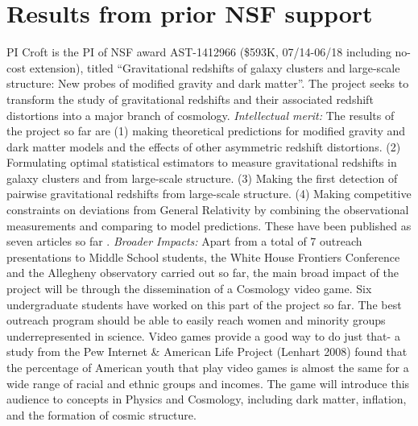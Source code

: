 \section{Results from prior NSF support}

PI Croft is the PI of NSF award AST-1412966 (\$593K, 07/14-06/18
including no-cost extension), titled ``Gravitational redshifts of
galaxy clusters and large-scale structure: New probes of modified
gravity and dark matter''.  The project seeks to transform the study
of gravitational redshifts and their associated redshift distortions
into a major branch of cosmology.  {\it Intellectual merit:} The
results of the project so far are (1) making theoretical predictions
for modified gravity and dark matter models and the effects of other
asymmetric redshift distortions.  (2) Formulating optimal statistical
estimators to measure gravitational redshifts in galaxy clusters and
from large-scale structure.  (3) Making the first detection of
pairwise gravitational redshifts from large-scale structure. (4)
Making competitive constraints on deviations from General Relativity
by combining the observational measurements and comparing to model
predictions. These have been published as seven articles so far
\citep{2015MNRAS.453.1754A,2017MNRAS.471.2345Z,2017MNRAS.471.2077A,2017MNRAS.470.2822A,2017arXiv170907854G,2017MNRAS.465.4853A,2016MNRAS.456.3743A}. {\it
  Broader Impacts:} Apart from a total of 7 outreach presentations to
Middle School students, the White House Frontiers Conference and the
Allegheny observatory carried out so far, the main broad impact of the
project will be through the dissemination of a Cosmology video
game. Six undergraduate students have worked on this part of the
project so far.  The best outreach program should be able to easily
reach women and minority groups underrepresented in science. Video
games provide a good way to do just that- a study from the Pew
Internet \& American Life Project (Lenhart 2008) found that the
percentage of American youth that play video games is almost the same
for a wide range of racial and ethnic groups and incomes.  The game
will introduce this audience to concepts in Physics and Cosmology,
including dark matter, inflation, and the formation of cosmic
structure.



